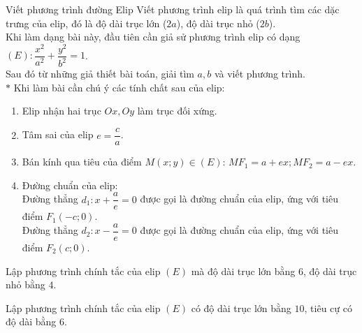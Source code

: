 \begin{dang}{Viết phương trình đường Elip}
	Viết phương trình elip là quá trình tìm các dặc trưng của elip, đó là độ dài trục lớn ($2a$), độ dài trục nhỏ ($2b$).\\
	Khi làm dạng bài này, đầu tiên cần giả sử phương trình elip có dạng $(E):\dfrac{x^{2}}{a^{2}}+\dfrac{y^{2}}{b^{2}}=1$.\\
	Sau đó từ những giả thiết bài toán, giải tìm $a,b$ và viết phương trình.\\
	$\ast$ Khi làm bài cần chú ý các tính chất sau của elip:
	\begin{enumerate}
		\item Elip nhận hai trục $Ox,Oy$ làm trục đối xứng. 
		\item Tâm sai của elip $e=\dfrac{c}{a}$.
		\item Bán kính qua tiêu của điểm $M(x;y)\in (E)$: $MF_1=a+ex; MF_2=a-ex$.
		\item Đường chuẩn của elip:\\Đường thẳng $d_1: x+\dfrac{a}{e}=0$ được gọi là đường chuẩn của elip, ứng với tiêu điểm $F_1(-c;0)$.\\Đường thẳng $d_2: x-\dfrac{a}{e}=0$ được gọi là đường chuẩn của elip, ứng với tiêu điểm $F_2(c;0).$      
	\end{enumerate}
\end{dang}
\begin{vd}%
	Lập phương trình chính tắc của elip $(E)$ mà độ dài trục lớn bằng  $6$, độ dài trục nhỏ bằng $4$.
\end{vd}
\begin{vd}%
	Lập phương trình chính tắc của elip $(E)$ có độ dài trục lớn bằng $10$, tiêu cự có độ dài bằng $6$.
\end{vd}
